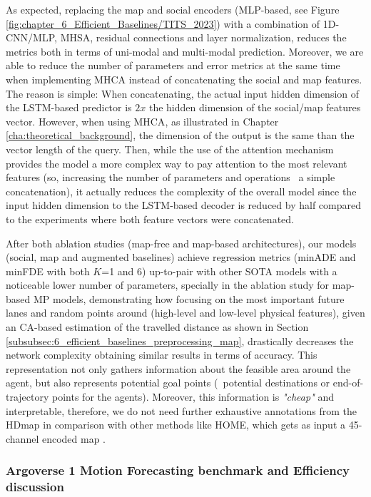 As expected, replacing the map and social encoders (\ac{MLP}-based, see Figure \ref{fig:chapter_6_Efficient_Baselines/TITS_2023}) with a combination of 1D-\ac{CNN}/\ac{MLP}, \ac{MHSA}, residual connections and layer normalization, reduces the metrics both in terms of uni-modal and multi-modal prediction. Moreover, we are able to reduce the number of parameters and error metrics at the same time when implementing \ac{MHCA} instead of concatenating the social and map features. The reason is simple: When concatenating, the actual input hidden dimension of the \ac{LSTM}-based predictor is $2x$ the hidden dimension of the social/map features vector. However, when using \ac{MHCA}, as illustrated in Chapter \ref{cha:theoretical_background}, the dimension of the output is the same than the vector length of the query. Then, while the use of the attention mechanism provides the model a more complex way to pay attention to the most relevant features (so, increasing the number of parameters and operations \wrt \ a simple concatenation), it actually reduces the complexity of the overall model since the input hidden dimension to the \ac{LSTM}-based decoder is reduced by half compared to the experiments where both feature vectors were concatenated.

After both ablation studies (map-free and map-based architectures), our models (social, map and augmented baselines) achieve regression metrics (\ac{minADE} and \ac{minFDE} with both $K$=1 and 6) up-to-pair with other \ac{SOTA} models with a noticeable lower number of parameters, specially in the ablation study for map-based \ac{MP} models, demonstrating how focusing on the most important future lanes and random points around (high-level and low-level physical features), given an \ac{CA}-based estimation of the travelled distance as shown in Section \ref{subsubsec:6_efficient_baselines_preprocessing_map}, drastically decreases the network complexity obtaining similar results in terms of accuracy. This representation not only gathers information about the feasible area around the agent, but also represents potential goal points \cite{dendorfer2020goal} (\ie \ potential destinations or end-of-trajectory points for the agents). Moreover, this information is \textit{"cheap"} and interpretable, therefore, we do not need further exhaustive annotations from the \ac{HDmap} in comparison with other methods like HOME, which gets as input a 45-channel encoded map \cite{gilles2021home}.

\subsubsection{Argoverse 1 Motion Forecasting benchmark and Efficiency discussion}
\label{subsubsec:6_efficient_baselines_argo1_leaderboard}

